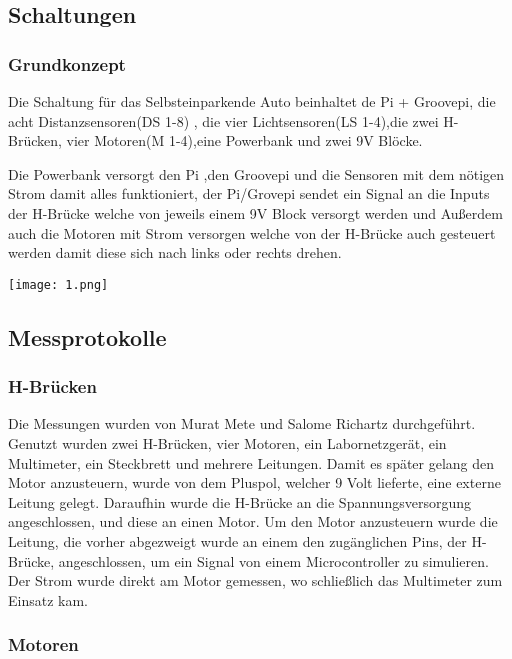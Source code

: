 \documentclass[notitlepage]{report}
\begin{document}
\subsection{Schaltungen}

\subsubsection{Grundkonzept}

Die Schaltung f\"{u}r das Selbsteinparkende Auto beinhaltet de Pi + Groovepi, die acht Distanzsensoren(DS 1-8) , die vier Lichtsensoren(LS 1-4),die zwei H-Br\"{u}cken, vier Motoren(M 1-4),eine Powerbank und zwei 9V Bl\"{o}cke.

Die Powerbank versorgt den Pi ,den Groovepi und die Sensoren mit dem n\"{o}tigen Strom damit alles funktioniert, der Pi/Grovepi sendet ein Signal an die Inputs der H-Br\"{u}cke welche von jeweils einem 9V Block versorgt werden und Au{\ss}erdem auch die Motoren mit Strom versorgen welche von der H-Br\"{u}cke auch gesteuert werden damit diese sich nach links oder rechts drehen.

\texttt{[image: 1.png]}

\subsection{Messprotokolle}

\subsubsection{H-Br\"{u}cken}
Die Messungen wurden von Murat Mete und Salome Richartz durchgef\"{u}hrt. Genutzt wurden zwei H-Br\"{u}cken, vier Motoren, ein Labornetzger\"{a}t, ein Multimeter, ein Steckbrett und mehrere Leitungen. Damit es  sp\"{a}ter gelang den Motor anzusteuern, wurde von dem Pluspol, welcher 9 Volt lieferte, eine externe Leitung gelegt. Daraufhin wurde die H-Br\"{u}cke an die Spannungsversorgung angeschlossen, und diese an einen Motor. Um den Motor anzusteuern wurde die Leitung, die vorher abgezweigt wurde an einem den zug\"{a}nglichen Pins, der H-Br\"{u}cke, angeschlossen, um ein Signal von einem Microcontroller zu simulieren. Der Strom wurde direkt am Motor gemessen, wo schlie{\ss}lich das Multimeter zum Einsatz kam.

\subsubsection{Motoren}
\end{document}

